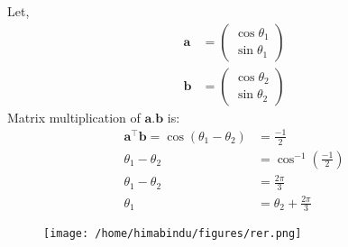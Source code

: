 \documentclass[12pt,-letter paper]{article}
\let\vec\mathbf{}
\let\vec\mathbf{}
\let\vec\mathbf{}
\providecommand{\brak}[1]{\ensuremath{\left(#1\right)}}
\newcommand{\myvec}[1]{\ensuremath{\begin{pmatrix}#1\end{pmatrix}}}
\providecommand{\brak}[1]{\ensuremath{\left(#1\right)}}
\begin{document}
\begin{enumerate}
Let, \begin{align}
	\vec{a} &= \myvec{\cos \theta_1 \\ \sin \theta_1}\\
	\vec{b} &= \myvec{\cos \theta_2 \\ \sin \theta_2}
\end{align}
Matrix multiplication of $\vec{a}.\vec{b}$ is:
\begin{align}
	\vec{a}^{\top}\vec {b}= \cos \brak{\theta_1 -\theta_2} &= \frac{-1}{2}\\
	\theta_1 - \theta_2& =\cos^{-1} \brak{\frac{-1}{2}}\\
	\theta_1 - \theta_2 &= \frac{2\pi}{3}\\
	\theta_1 &= \theta_2 +\frac{2\pi}{3}
\end{align}
  \begin{figure}[H]
	  \centering        
	  \texttt{[image: /home/himabindu/figures/rer.png]}
	  \caption{}       
	  \label{fig:python generated plot}
  \end{figure}
\end{enumerate}
\end{document}
